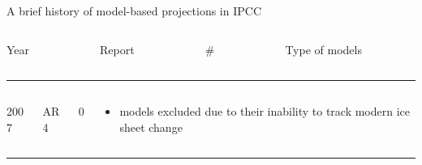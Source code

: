 \documentclass[hide notes,intlimits]{beamer}
\begin{document}
{
%
}




\begin{frame}{A brief history of model-based projections in IPCC}
  \begin{columns}[c]
    \begin{column}{.1\linewidth}
      Year
    \end{column}
    \begin{column}{.1\linewidth}
      Report
    \end{column}
    \begin{column}{.12\linewidth}
      \# 
    \end{column}
    \begin{column}{.60\linewidth}
      Type of models
    \end{column}
  \end{columns}
  \vspace{0.25em}
  \hrule

  \begin{columns}[c]
    \begin{column}{.1\linewidth}
      2007
    \end{column}
    \begin{column}{.1\linewidth}
      AR4
    \end{column}
    \begin{column}{.12\linewidth}
      0
    \end{column}
    \begin{column}{.6\linewidth}
      \begin{itemize}
      \item models excluded due to their inability to track modern ice sheet change
      \end{itemize}
    \end{column}
  \end{columns}
  \hrule

\end{frame}
\end{document}
